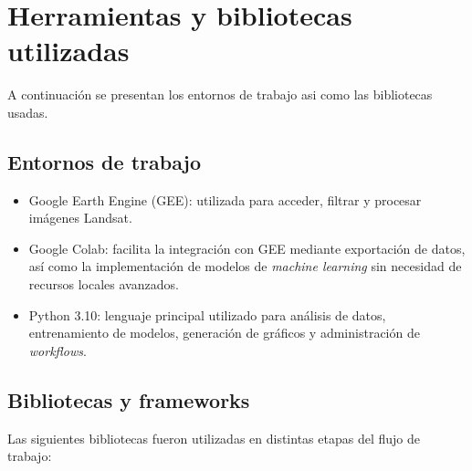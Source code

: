 \section{Herramientas y bibliotecas utilizadas}
A continuación se presentan los entornos de trabajo asi como las bibliotecas usadas.


\subsection*{Entornos de trabajo}

\begin{itemize}
    \item Google Earth Engine (GEE): utilizada para acceder, filtrar y procesar imágenes Landsat. 
    
    \item Google Colab: facilita la integración con GEE mediante exportación de datos, así como la implementación de modelos de \textit{machine learning} sin necesidad de recursos locales avanzados.

    \item Python 3.10: lenguaje principal utilizado para análisis de datos, entrenamiento de modelos, generación de gráficos y administración de \textit{workflows}.
\end{itemize}


\subsection*{Bibliotecas y frameworks}

Las siguientes bibliotecas fueron utilizadas en distintas etapas del flujo de trabajo:

